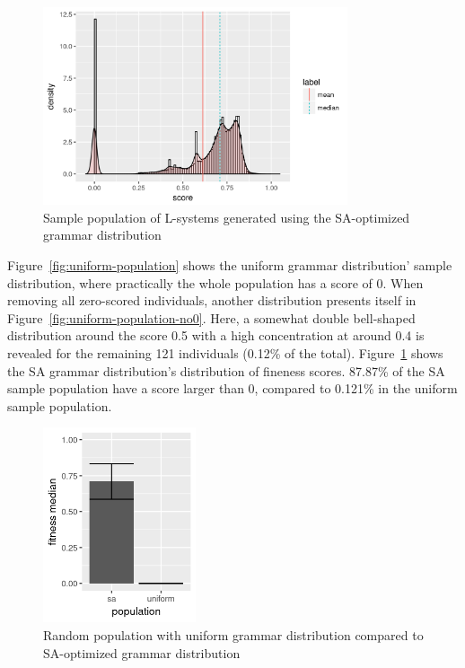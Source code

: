 \begin{figure}
    \centering
    \includegraphics[width=0.8\textwidth]{figures/sa-population}
    \caption[Sample population of L-systems generated using the SA-optimized grammar distribution]{Sample population of \glspl{L-system} generated using the \gls{SA}-optimized grammar distribution}
    \label{fig:sa-population}
\end{figure}

Figure~\ref{fig:uniform-population} shows the uniform grammar distribution' sample distribution, where practically the whole population has a score of 0.
When removing all zero-scored individuals, another distribution presents itself in Figure~\ref{fig:uniform-population-no0}.
Here, a somewhat double bell-shaped distribution around the score 0.5 with a high concentration at around 0.4 is revealed for the remaining 121 individuals (0.12\% of the total).
Figure~\ref{fig:sa-population} shows the \gls{SA} grammar distribution's distribution of fineness scores.
87.87\% of the \gls{SA} sample population have a score larger than 0, compared to 0.121\% in the uniform sample population.

\begin{figure}
    \centering
    \includegraphics[width=0.4\textwidth]{figures/sa-uniform}
    \caption[Random population with uniform grammar distribution compared to SA-optimized grammar distribution]{Random population with uniform grammar distribution compared to \gls{SA}-optimized grammar distribution}
    \label{fig:sa-uniform}
\end{figure}

